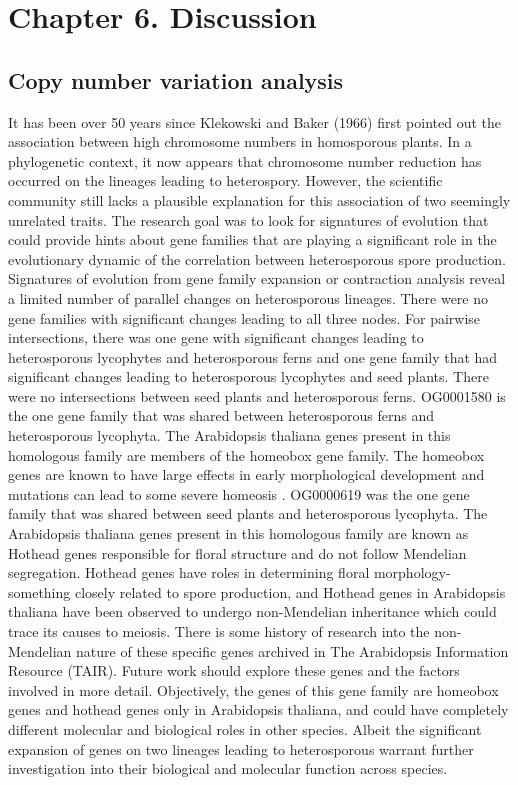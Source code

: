 \chapter{Chapter 6. Discussion}

\section{Copy number variation analysis}

It has been over 50 years since Klekowski and Baker (1966) first pointed out the
association between high chromosome numbers in homosporous plants. In a phylogenetic
context, it now appears that chromosome number reduction has occurred on the lineages leading
to heterospory. However, the scientific community still lacks a plausible explanation for this
association of two seemingly unrelated traits. The research goal was to look for signatures of
evolution that could provide hints about gene families that are playing a significant role in the
evolutionary dynamic of the correlation between heterosporous spore production. Signatures of
evolution from gene family expansion or contraction analysis reveal a limited number of parallel
changes on heterosporous lineages. There were no gene families with significant changes leading
to all three nodes. For pairwise intersections, there was one gene with significant changes leading
to heterosporous lycophytes and heterosporous ferns and one gene family that had significant
changes leading to heterosporous lycophytes and seed plants. There were no intersections
between seed plants and heterosporous ferns.
OG0001580 is the one gene family that was shared between heterosporous ferns and
heterosporous lycophyta. The Arabidopsis thaliana genes present in this homologous family are
members of the homeobox gene family. The homeobox genes are known to have large effects in
early morphological development and mutations can lead to some severe homeosis \cite{Gehring1993-mf}. OG0000619 was the one gene family that was shared between seed plants and
heterosporous lycophyta. The Arabidopsis thaliana genes present in this homologous family are
known as Hothead genes responsible for floral structure and do not follow Mendelian
segregation. Hothead genes have roles in determining floral morphology- something closely
related to spore production, and Hothead genes in Arabidopsis thaliana have been observed to
undergo non-Mendelian inheritance \cite{Rhee2003-ww} which could trace its causes to meiosis.
There is some history of research into the non-Mendelian nature of these specific genes archived
in The Arabidopsis Information Resource (TAIR). Future work should explore these genes and
the factors involved in more detail.
Objectively, the genes of this gene family are homeobox genes and hothead genes only in
Arabidopsis thaliana, and could have completely different molecular and biological roles in
other species. Albeit the significant expansion of genes on two lineages leading to heterosporous
warrant further investigation into their biological and molecular function across species.

